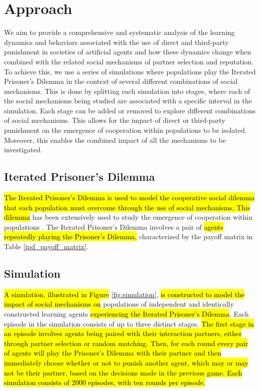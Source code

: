 \documentclass[sn-aps,numbered]{sn-jnl}%
\theoremstyle{thmstyleone}%
\theoremstyle{thmstyletwo}%
\theoremstyle{thmstylethree}%
\begin{document}
\section{Approach}

We aim to provide a comprehensive and systematic analysis of the learning dynamics and behaviors associated with the use of direct and third-party punishment in societies of artificial agents and how these dynamics change when combined with the related social mechanisms of partner selection and reputation. To achieve this, we use a series of simulations where populations play the Iterated Prisoner's Dilemma in the context of several different combinations of social mechanisms. This is done by splitting each simulation into stages, where each of the social mechanisms being studied are associated with a specific interval in the simulation. Each stage can be added or removed to explore different combinations of social mechanisms. This allows for the impact of direct or third-party punishment on the emergence of cooperation within populations to be isolated. Moreover, this enables the combined impact of all the mechanisms to be investigated. 

\subsection{Iterated Prisoner's Dilemma}

\hl{The Iterated Prisoner's Dilemma is used to model the cooperative social dilemma that each population must overcome through the use of social mechanisms. This dilemma} has been extensively used to study the emergence of cooperation within populations \citep{evolution_of_cooperation, extortion_cooperation_prisoners_dilemma, Albert2007_nicer, Dreber2008}. The Iterated Prisoner's Dilemma involves a pair of \hl{agents repeatedly playing the Prisoner's Dilemma,} characterized by the payoff matrix in Table \ref{ipd_payoff_matrix}.

%

\subsection{Simulation}

\hl{A simulation, illustrated in Figure} \ref{fig:simulation}, \hl{is constructed to model the impact of social mechanisms on} populations of independent and identically constructed learning agents \hl{experiencing the Iterated Prisoner's Dilemma}. Each episode in the simulation consists of up to three distinct stages. \hl{The first stage in an episode involves agents being paired with their interaction partners, either through partner selection or random matching. Then, for each round every pair of agents will play the Prisoner's Dilemma with their partner and then immediately choose whether or not to punish another agent, which may or may not be their partner, based on the decisions made in the previous game. Each simulation consists of 2000 episodes, with ten rounds per episode.} 
\end{document}
